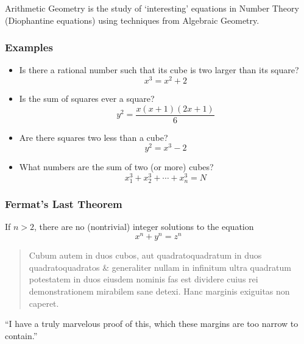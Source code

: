 
\begin{frame}[plain]
\begin{dfn}
Arithmetic Geometry is the study of `interesting' equations in Number Theory (Diophantine equations) using techniques from Algebraic Geometry.
\end{dfn}
\end{frame}



\begin{frame}[plain] \frametitle{Examples}
\begin{itemize}
\item Is there a rational number such that its cube is two larger than its square?
	\[
	x^3= x^2 + 2
	\]

\item Is the sum of squares ever a square? 
	\[
	y^2= \dfrac{x (x + 1) (2x + 1)}{6}
	\]

\item Are there squares two less than a cube? 
	\[
	y^2= x^3 - 2
	\]

\item What numbers are the sum of two (or more) cubes? 
	\[
	x_1^3+x_2^3+\cdots+x_n^3= N
	\]
\end{itemize}
\end{frame}








\begin{frame} \frametitle{Fermat's Last Theorem}

\begin{thm}
If $n > 2$, there are no (nontrivial) integer solutions to the equation
	\[
	x^n + y^n= z^n
	\]
\end{thm} \pspace

\begin{quote}
Cubum autem in duos cubos, aut quadratoquadratum in duos quadratoquadratos \& generaliter nullam in infinitum ultra quadratum potestatem in duos eiusdem nominis fas est dividere cuius rei demonstrationem mirabilem sane detexi. Hanc marginis exiguitas non caperet.
\end{quote} \pspace

``I have a truly marvelous proof of this, which these margins are too narrow to contain.''
\end{frame}





